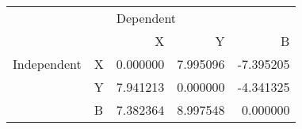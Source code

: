 \begin{tabular}{llrrr}
\toprule
            &   & \multicolumn{3}{l}{Dependent} \\
            &   &         X &         Y &         B \\
\midrule
Independent & X &  0.000000 &  7.995096 & -7.395205 \\
            & Y &  7.941213 &  0.000000 & -4.341325 \\
            & B &  7.382364 &  8.997548 &  0.000000 \\
\bottomrule
\end{tabular}
